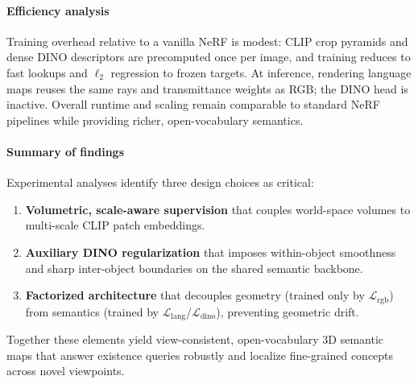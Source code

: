 \begin{enrichment}
\begin{enrichment}
        
        \paragraph{Efficiency analysis}
        Training overhead relative to a vanilla NeRF is modest: CLIP crop pyramids and dense DINO descriptors are precomputed once per image, and training reduces to fast lookups and $\ell_2$ regression to frozen targets. At inference, rendering language maps reuses the same rays and transmittance weights as RGB; the DINO head is inactive. Overall runtime and scaling remain comparable to standard NeRF pipelines while providing richer, open-vocabulary semantics.
        
        \paragraph{Summary of findings}
        Experimental analyses identify three design choices as critical:
        \begin{enumerate}
            \item \textbf{Volumetric, scale-aware supervision} that couples world-space volumes to multi-scale CLIP patch embeddings.
            \item \textbf{Auxiliary DINO regularization} that imposes within-object smoothness and sharp inter-object boundaries on the shared semantic backbone.
            \item \textbf{Factorized architecture} that decouples geometry (trained only by $\mathcal{L}_{\text{rgb}}$) from semantics (trained by $\mathcal{L}_{\text{lang}}$/$\mathcal{L}_{\text{dino}}$), preventing geometric drift.
        \end{enumerate}
        Together these elements yield view-consistent, open-vocabulary 3D semantic maps that answer existence queries robustly and localize fine-grained concepts across novel viewpoints.
        
    \end{enrichment}
    
    \newpage 
    
    \begin{enrichment}
        \label{enr:subsec_chapter23_instructnerf2nerf}
        

\end{enrichment}
\end{enrichment}
